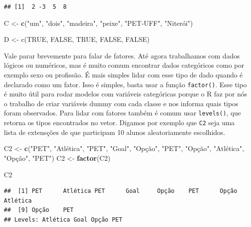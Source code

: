 \documentclass[
]{article}
\newenvironment{Shaded}{\begin{snugshade}}{\end{snugshade}}
\newcommand{\KeywordTok}[1]{\textcolor[rgb]{0.13,0.29,0.53}{\textbf{#1}}}
\newcommand{\NormalTok}[1]{#1}
\newcommand{\StringTok}[1]{\textcolor[rgb]{0.31,0.60,0.02}{#1}}
\begin{document}
\begin{verbatim}
## [1]  2 -3  5  8
\end{verbatim}

\begin{Shaded}
\begin{Highlighting}[]
\NormalTok{C <-}\StringTok{ }\KeywordTok{c}\NormalTok{(}\StringTok{"um"}\NormalTok{, }\StringTok{"dois"}\NormalTok{, }\StringTok{"madeira"}\NormalTok{, }\StringTok{"peixe"}\NormalTok{, }\StringTok{"PET-UFF"}\NormalTok{, }\StringTok{"Niterói")}

\StringTok{D <- c(TRUE, FALSE, TRUE, FALSE, FALSE)}
\end{Highlighting}
\end{Shaded}

Vale parar brevemente para falar de fatores. Até agora trabalhamos com
dados lógicos ou numéricos, mas é muito comum encontrar dados
categóricos como por exemplo sexo ou profissão. É mais simples lidar com
esse tipo de dado quando é declarado como um fator. Isso é simples,
basta usar a função \texttt{factor()}. Esse tipo é muito útil para rodar
modelos com variáveis categóricas porque o R faz por nós o trabalho de
criar variáveis dummy com cada classe e nos informa quais tipos foram
observados. Para lidar com fatores também é comum usar
\texttt{levels()}, que retorna os tipos encontrados no vetor. Digamos
por exemplo que \texttt{C2} seja uma lista de extensções de que
participam 10 alunos aleatoriamente escolhidos.

\begin{Shaded}
\begin{Highlighting}[]
\NormalTok{C2 <-}\StringTok{ }\KeywordTok{c}\NormalTok{(}\StringTok{"PET"}\NormalTok{, }\StringTok{"Atlética"}\NormalTok{, }\StringTok{"PET"}\NormalTok{, }\StringTok{"Goal"}\NormalTok{, }\StringTok{"Opção"}\NormalTok{, }\StringTok{"PET"}\NormalTok{, }\StringTok{"Opção"}\NormalTok{, }\StringTok{"Atlética"}\NormalTok{, }\StringTok{"Opção"}\NormalTok{, }\StringTok{"PET"}\NormalTok{)}
\NormalTok{C2 <-}\StringTok{ }\KeywordTok{factor}\NormalTok{(C2)}

\NormalTok{C2}
\end{Highlighting}
\end{Shaded}

\begin{verbatim}
##  [1] PET      Atlética PET      Goal     Opção    PET      Opção    Atlética
##  [9] Opção    PET     
## Levels: Atlética Goal Opção PET
\end{verbatim}
\end{document}

